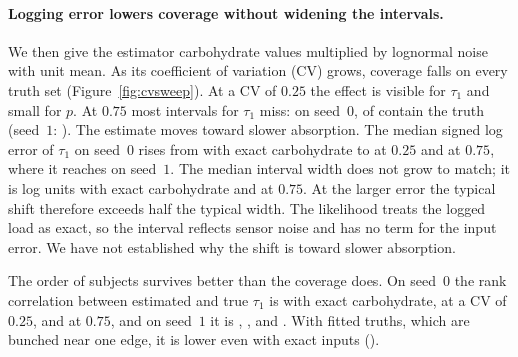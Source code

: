 \paragraph{Logging error lowers coverage without widening the intervals.}
We then give the estimator carbohydrate values multiplied by lognormal noise with unit mean.
As its coefficient of variation (CV) grows, coverage falls on every truth set (Figure~\ref{fig:cvsweep}).
At a CV of $0.25$ the effect is visible for $\tau_1$ and small for $p$.
At $0.75$ most intervals for $\tau_1$ miss: on seed~$0$, \resCRandThreeQuarterTauCover{} of \resCRandThreeQuarterTauN{} contain the truth (seed~$1$: \resCRandThreeQuarterSeedOneTauCover).
The estimate moves toward slower absorption.
The median signed log error of $\tau_1$ on seed~$0$ rises from \resCRandZeroTauShift{} with exact carbohydrate to \resCRandQuarterTauShift{} at $0.25$ and \resCRandThreeQuarterTauShift{} at $0.75$, where it reaches \resCRandThreeQuarterSeedOneTauShift{} on seed~$1$.
The median interval width does not grow to match; it is \resCRandZeroTauWidth{} log units with exact carbohydrate and \resCRandThreeQuarterTauWidth{} at $0.75$.
At the larger error the typical shift therefore exceeds half the typical width.
The likelihood treats the logged load as exact, so the interval reflects sensor noise and has no term for the input error.
We have not established why the shift is toward slower absorption.

The order of subjects survives better than the coverage does.
On seed~$0$ the rank correlation between estimated and true $\tau_1$ is \resCRandZeroTauRankRho{} with exact carbohydrate, \resCRandQuarterTauRankRho{} at a CV of $0.25$, and \resCRandThreeQuarterTauRankRho{} at $0.75$, and on seed~$1$ it is \resCRandZeroSeedOneTauRankRho, \resCRandQuarterSeedOneTauRankRho, and \resCRandThreeQuarterSeedOneTauRankRho.
With fitted truths, which are bunched near one edge, it is lower even with exact inputs (\resCFitZeroTauRankRho).

